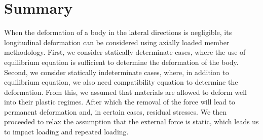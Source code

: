 \documentclass[
fontsize=10pt,
a4paper,
twosides=false,
open=any,
svgnames,
]{kaobook} %
\begin{document}
  
  


\section*{Summary}

When the deformation of a body in the lateral directions is negligible, its longitudinal deformation can be considered using axially loaded member methodology. First, we consider statically determinate cases, where the use of equilibrium equation is sufficient to determine the deformation of the body. Second, we consider statically indeterminate cases, where, in addition to equilibrium equation, we also need compatibility equation to determine the deformation. From this, we assumed that materials are allowed to deform well into their plastic regimes. After which the removal of the force will lead to permanent deformation and, in certain cases, residual stresses. We then proceeded to relax the assumption that the external force is static, which leads us to impact loading and repeated loading.
\end{document}
